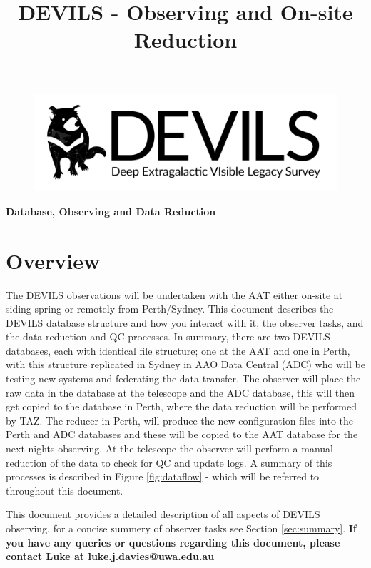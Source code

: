 \documentclass[12pt]{article}
\begin{document}
\title{DEVILS - Observing and On-site Reduction}
\begin{center}

\begin{figure}
\begin{center}
\includegraphics[scale=0.8]{devils-logo_big.png}
\end{center}
\end{figure}

\Huge {\textcolor{PineGreen}{\textbf{Database, Observing and Data Reduction}}}
\end{center}
\normalsize


\section{Overview}

The DEVILS observations will be undertaken with the AAT either on-site at siding spring or remotely from Perth/Sydney. This document describes the DEVILS database structure and how you interact with it, the observer tasks, and the data reduction and QC processes. In summary, there are two DEVILS databases, each with identical file structure; one at the AAT and one in Perth, with this structure replicated in Sydney in AAO Data Central (ADC) who will be testing new systems and federating the data transfer. The observer will place the raw data in the database at the telescope and the ADC database, this will then get copied to the database in Perth, where the data reduction will be performed by TAZ. The reducer in Perth, will produce the new configuration files into the Perth and ADC databases and these will be copied to the AAT database for the next nights observing. At the telescope the observer will perform a manual reduction of the data to check for QC and update logs. A summary of this processes is described in Figure \ref{fig:dataflow} - which will be referred to throughout this document. 

This document provides a detailed description of all aspects of DEVILS observing, for a concise summery of observer tasks see Section \ref{sec:summary}. \textcolor{PineGreen}{\textbf{If you have any queries or questions regarding this document, please contact Luke at luke.j.davies@uwa.edu.au}}\\
\end{document}
